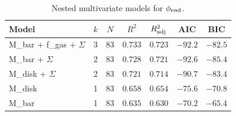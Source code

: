 \begin{table}[htbp]
\centering
\caption{Nested multivariate models for $\phi_{\rm end}$.}
\label{tab:models}
\begin{tabular}{lcccccc}
\hline
Model & $k$ & $N$ & $R^2$ & $R^2_{\rm adj}$ & AIC & BIC \\
\hline
M\_bar + f\_gas + $\Sigma$ & 3 & 83 & $0.733$ & $0.723$ & $-92.2$ & $-82.5$ \\
M\_bar + $\Sigma$ & 2 & 83 & $0.728$ & $0.721$ & $-92.6$ & $-85.4$ \\
M\_disk + $\Sigma$ & 2 & 83 & $0.721$ & $0.714$ & $-90.7$ & $-83.4$ \\
M\_disk & 1 & 83 & $0.658$ & $0.654$ & $-75.6$ & $-70.8$ \\
M\_bar & 1 & 83 & $0.635$ & $0.630$ & $-70.2$ & $-65.4$ \\
\hline
\end{tabular}
\end{table}
